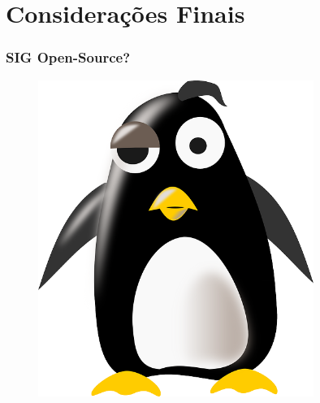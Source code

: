 \documentclass[hyperref={pdfpagelabels=true}]{beamer}
\begin{document}



\section{Considera\c{c}\~{o}es Finais} 

\begin{frame}
\frametitle{SIG Open-Source?}

        \begin{figure}   
            \includegraphics[width=0.8\textwidth]{tux.png}
        \end{figure} 

\end{frame}
\end{document}
